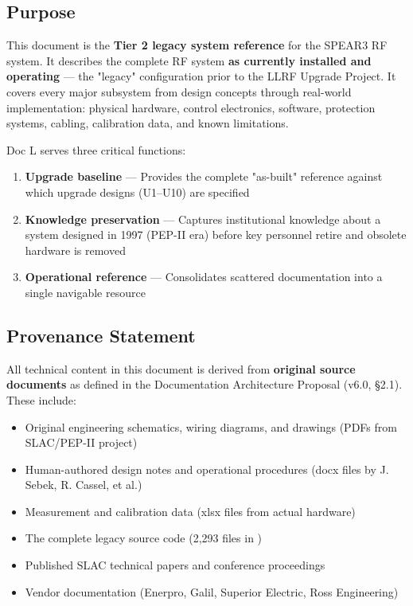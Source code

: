 \subsection*{Purpose}\label{purpose}

This document is the \textbf{Tier 2 legacy system reference} for the SPEAR3 RF system. It describes the complete RF system \textbf{as currently installed and operating} --- the "legacy" configuration prior to the LLRF Upgrade Project. It covers every major subsystem from design concepts through real-world implementation: physical hardware, control electronics, software, protection systems, cabling, calibration data, and known limitations.

Doc L serves three critical functions:

\begin{enumerate}
\def\labelenumi{\arabic{enumi}.}
\tightlist
\item
  \textbf{Upgrade baseline} --- Provides the complete "as-built" reference against which upgrade designs (U1--U10) are specified
\item
  \textbf{Knowledge preservation} --- Captures institutional knowledge about a system designed in 1997 (PEP-II era) before key personnel retire and obsolete hardware is removed
\item
  \textbf{Operational reference} --- Consolidates scattered documentation into a single navigable resource
\end{enumerate}

\subsection*{Provenance Statement}\label{provenance-statement}

All technical content in this document is derived from \textbf{original source documents} as defined in the Documentation Architecture Proposal (v6.0, §2.1). These include:

\begin{itemize}
\tightlist
\item
  Original engineering schematics, wiring diagrams, and drawings (PDFs from SLAC/PEP-II project)
\item
  Human-authored design notes and operational procedures (docx files by J. Sebek, R. Cassel, et al.)
\item
  Measurement and calibration data (xlsx files from actual hardware)
\item
  The complete legacy source code (2,293 files in )
\item
  Published SLAC technical papers and conference proceedings
\item
  Vendor documentation (Enerpro, Galil, Superior Electric, Ross Engineering)
\end{itemize}

